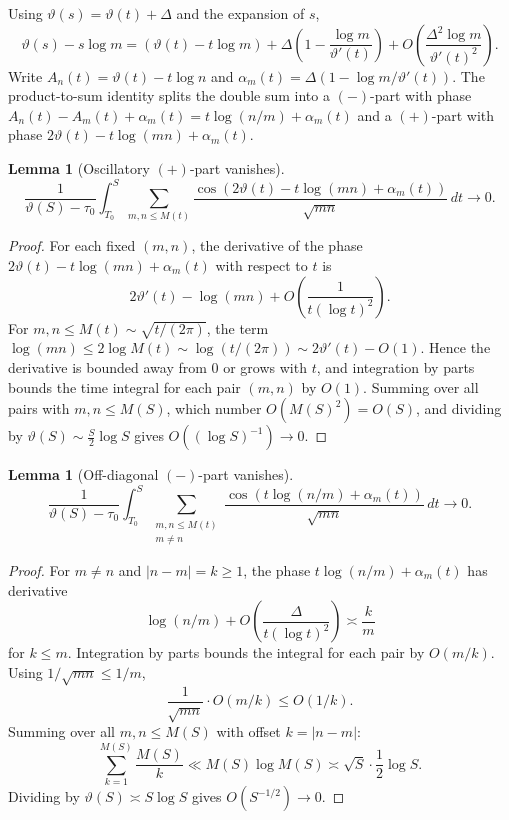 \documentclass[11pt]{article}
\numberwithin{equation}{section}
\theoremstyle{plain}
\newtheorem{lemma}[theorem]{Lemma}
\theoremstyle{definition}
\begin{document}
Using \(\vartheta(s)=\vartheta(t)+\Delta\) and the expansion of \(s\),
\[
\vartheta(s)-s\log m
=(\vartheta(t)-t\log m)
+\Delta\!\left(1-\frac{\log m}{\vartheta'(t)}\right)
+O\!\left(\frac{\Delta^2\log m}{\vartheta'(t)^2}\right).
\]
Write \(A_n(t)=\vartheta(t)-t\log n\) and
\(\alpha_m(t)=\Delta(1-\log m/\vartheta'(t))\).
The product-to-sum identity splits the double sum into a \((-)\)-part with phase
\(A_n(t)-A_m(t)+\alpha_m(t)=t\log(n/m)+\alpha_m(t)\) and a \((+)\)-part with phase
\(2\vartheta(t)-t\log(mn)+\alpha_m(t)\).

\begin{lemma}[Oscillatory \((+)\)-part vanishes]
\[
\frac{1}{\vartheta(S)-\tau_0}
\int_{T_0}^S
\sum_{m,n\le M(t)}
\frac{\cos(2\vartheta(t)-t\log(mn)+\alpha_m(t))}{\sqrt{mn}}
\,dt
\to 0.
\]
\end{lemma}

\begin{proof}
For each fixed \((m,n)\), the derivative of the phase \(2\vartheta(t)-t\log(mn)+\alpha_m(t)\)
with respect to \(t\) is
\[
2\vartheta'(t)-\log(mn)+O\!\left(\frac{1}{t(\log t)^2}\right).
\]
For \(m,n\le M(t)\sim\sqrt{t/(2\pi)}\), the term \(\log(mn)\le 2\log M(t)\sim\log(t/(2\pi))\sim 2\vartheta'(t)-O(1)\).
Hence the derivative is bounded away from \(0\) or grows with \(t\), and integration
by parts bounds the time integral for each pair \((m,n)\) by \(O(1)\). Summing over
all pairs with \(m,n\le M(S)\), which number \(O(M(S)^2)=O(S)\), and dividing by
\(\vartheta(S)\sim\frac{S}{2}\log S\) gives \(O((\log S)^{-1})\to0\).
\end{proof}

\begin{lemma}[Off-diagonal \((-)\)-part vanishes]
\[
\frac{1}{\vartheta(S)-\tau_0}
\int_{T_0}^S
\sum_{\substack{m,n\le M(t)\\m\neq n}}
\frac{\cos(t\log(n/m)+\alpha_m(t))}{\sqrt{mn}}
\,dt
\to 0.
\]
\end{lemma}

\begin{proof}
For \(m\neq n\) and \(|n-m|=k\ge1\), the phase \(t\log(n/m)+\alpha_m(t)\) has derivative
\[
\log(n/m)+O\!\left(\frac{\Delta}{t(\log t)^2}\right)
\asymp \frac{k}{m}
\]
for \(k\le m\). Integration by parts bounds the integral for each pair by
\(O(m/k)\). Using \(1/\sqrt{mn}\le 1/m\),
\[
\frac{1}{\sqrt{mn}}\cdot O(m/k)\le O(1/k).
\]
Summing over all \(m,n\le M(S)\) with offset \(k=|n-m|\):
\[
\sum_{k=1}^{M(S)}\frac{M(S)}{k}\ll M(S)\log M(S)\asymp \sqrt{S}\cdot\frac12\log S.
\]
Dividing by \(\vartheta(S)\asymp S\log S\) gives \(O(S^{-1/2})\to0\).
\end{proof}
\end{document}
